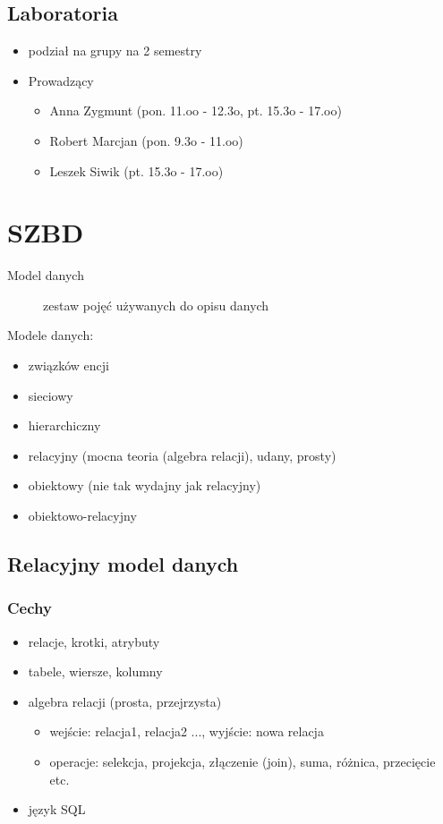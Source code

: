 \documentclass[12pt]{article}
\begin{document}
\subsection{Laboratoria}
\begin{itemize}
\item podział na grupy na 2 semestry
\item Prowadzący
\begin{itemize}
\item Anna Zygmunt (pon. 11.oo - 12.3o, pt. 15.3o - 17.oo)
\item Robert Marcjan (pon. 9.3o - 11.oo)
\item Leszek Siwik (pt. 15.3o - 17.oo)
\end{itemize}
\end{itemize}

\section{\ac{SZBD}}

\begin{description}
\item[Model danych] zestaw pojęć używanych do opisu danych
\end{description}

Modele danych:
\begin{itemize}
\item związków encji
\item sieciowy
\item hierarchiczny
\item relacyjny (mocna teoria (algebra relacji), udany, prosty)
\item obiektowy (nie tak wydajny jak relacyjny)
\item obiektowo-relacyjny
\end{itemize}

\subsection{Relacyjny model danych}
\subsubsection{Cechy}

\begin{itemize}
\item relacje, krotki, atrybuty
\item tabele, wiersze, kolumny
\item algebra relacji (prosta, przejrzysta)
\begin{itemize}
\item wejście: relacja1, relacja2 ..., wyjście: nowa relacja
\item operacje: selekcja, projekcja, złączenie (join), suma, różnica, przecięcie etc.
\end{itemize}
\item język \acs{SQL}
\end{itemize}
\end{document}
